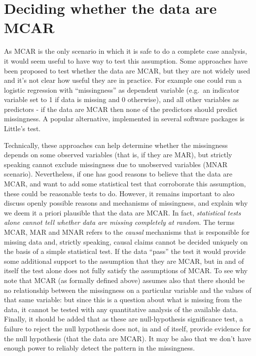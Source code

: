\documentclass[
]{book}
\begin{document}
\section{Deciding whether the data are MCAR}\label{deciding-whether-the-data-are-mcar}

As MCAR is the only scenario in which it is safe to do a complete case analysis, it would seem useful to have way to test this assumption. Some approaches have been proposed to test whether the data are MCAR, but they are not widely used and it's not clear how useful they are in practice. For example one could run a logistic regression with ``missingness'' as dependent variable (e.g.~an indicator variable set to 1 if data is missing and 0 otherwise), and all other variables as predictors - if the data are MCAR then none of the predictors should predict missingness. A popular alternative, implemented in several software packages is Little's test\citep{little88}.

Technically, these approaches can help determine whether the missingness depends on some observed variables (that is, if they are MAR), but strictly speaking cannot exclude missingness due to unobserved variables (MNAR scenario). Nevertheless, if one has good reasons to believe that the data are MCAR, and want to add some statistical test that corroborate this assumption, these could be reasonable tests to do. However, it remains important to also discuss openly possible reasons and mechanisms of missingness, and explain why we deem it a priori plausible that the data are MCAR. In fact, \emph{statistical tests alone cannot tell whether data are missing completely at random}. The terms MCAR, MAR and MNAR refers to the \emph{causal} mechanisms that is responsible for missing data and, strictly speaking, causal claims cannot be decided uniquely on the basis of a simple statistical test. If the data ``pass'' the test it would provide some additional support to the assumption that they are MCAR, but in and of itself the test alone does not fully satisfy the assumptions of MCAR. To see why note that MCAR (as formally defined above) assumes also that there should be no relationship between the missingness on a particular variable and the values of that same variable: but since this is a question about what is missing from the data, it cannot be tested with any quantitative analysis of the available data. Finally, it should be added that as these are null-hypothesis significance test, a failure to reject the null hypothesis does not, in and of itself, provide evidence for the null hypothesis (that the data are MCAR). It may be also that we don't have enough power to reliably detect the pattern in the missingness.
\end{document}
